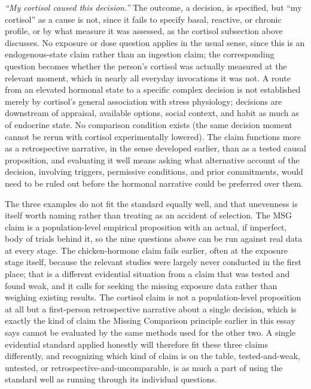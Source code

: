 \documentclass[11pt]{article}
\begin{document}
\emph{``My cortisol caused this decision.''} The outcome, a decision, is specified, but ``my cortisol'' as a cause is not, since it fails to specify basal, reactive, or chronic profile, or by what measure it was assessed, as the cortisol subsection above discusses. No exposure or dose question applies in the usual sense, since this is an endogenous-state claim rather than an ingestion claim; the corresponding question becomes whether the person's cortisol was actually measured at the relevant moment, which in nearly all everyday invocations it was not. A route from an elevated hormonal state to a specific complex decision is not established merely by cortisol's general association with stress physiology; decisions are downstream of appraisal, available options, social context, and habit as much as of endocrine state. No comparison condition exists (the same decision moment cannot be rerun with cortisol experimentally lowered). The claim functions more as a retrospective narrative, in the sense developed earlier, than as a tested causal proposition, and evaluating it well means asking what alternative account of the decision, involving triggers, permissive conditions, and prior commitments, would need to be ruled out before the hormonal narrative could be preferred over them.

The three examples do not fit the standard equally well, and that unevenness is itself worth naming rather than treating as an accident of selection. The MSG claim is a population-level empirical proposition with an actual, if imperfect, body of trials behind it, so the nine questions above can be run against real data at every stage. The chicken-hormone claim fails earlier, often at the exposure stage itself, because the relevant studies were largely never conducted in the first place; that is a different evidential situation from a claim that was tested and found weak, and it calls for seeking the missing exposure data rather than weighing existing results. The cortisol claim is not a population-level proposition at all but a first-person retrospective narrative about a single decision, which is exactly the kind of claim the Missing Comparison principle earlier in this essay says cannot be evaluated by the same methods used for the other two. A single evidential standard applied honestly will therefore fit these three claims differently, and recognizing which kind of claim is on the table, tested-and-weak, untested, or retrospective-and-uncomparable, is as much a part of using the standard well as running through its individual questions.
\end{document}
